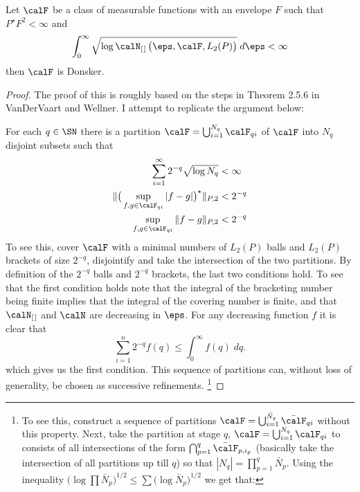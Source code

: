 \begin{theorem}
	\label{thm:donsker-bracketing}
	Let \(\calF\) be a class of measurable functions with an envelope \(F\) such that \(P^\star F^2 < \infty\) and
	\begin{equation}
		\label{eq:donsker-bracketing-condition}
		\int_{0}^{\infty} \sqrt{\log\calN_{[\hspace{0.1em}]}\left(\eps,\calF,L_2(P)\right)}\;d\eps <\infty
	\end{equation}
	then \(\calF\) is Donsker.
\end{theorem}
\begin{proof}
	The proof of this is roughly based on the steps in Theorem 2.5.6 in VanDerVaart and Wellner. I attempt to replicate the argument below:

	For each \(q\in\SN\) there is a partition \(\calF = \bigcup_{i=1}^{N_q} \calF_{qi}\) of \(\calF\) into \(N_q\) disjoint subsets such that 
	\begin{align*}
		\sum_{i=1}^{\infty} 2^{-q} \sqrt{\log N_q} &< \infty \\	
		\|\big(\sup_{f,g\in\calF_{qi}}|f-g|\big)^\star\|_{P,2} &< 2^{-q} \\
		\sup_{f,g\in\calF_{qi}} \|f-g\|_{P,2} &< 2^{-q}
	\end{align*}
	To see this, cover \(\calF\) with a minimal numbers of \(L_2(P)\) balls and \(L_2(P)\) brackets of size \(2^{-q}\), disjointify and take the intersection of the two partitions. By definition of the \(2^{-q}\) balls and \(2^{-q}\) brackets, the last two conditions hold. To see that the first condition holds note that the integral of the bracketing number being finite implies that the integral of the covering number is finite, and that \(\calN_{[\hspace{0.1em}]}\) and \(\calN\) are decreasing in \(\eps\). For any decreasing function \(f\) it is clear that
	\[
		\sum_{i=1}^n 2^{-q} f(q) \leq \int_0^\infty f(q)\;dq
	.\]
	which gives us the first condition. This sequence of partitions can, without loss of generality, be chosen as successive refinements.
	\footnote{To see this, construct a sequence of partitions \(\calF = \bigcup_{i=1}^{\bar N_q} \bar\calF_{qi}\) without this property. Next, take the partition at stage \(q\), \(\calF = \bigcup_{i=1}^{N_q}\calF_{qi}\) to consists of all intersections of the form \(\bigcap_{p=1}^q \bar\calF_{p,i_p}\) (basically take the intersection of all partitions up till \(q\)) so that \(|N_q| = \prod_{p=1}^q \bar N_p\). Using the inequality \(\big(\log\prod\bar N_p\big)^{1/2} \leq \sum \big(\log \bar N_p\big)^{1/2}\)  we get that:
}
\end{proof}
